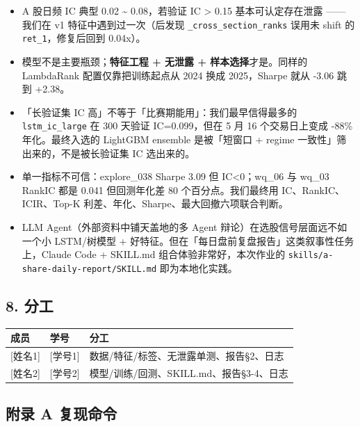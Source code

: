 \documentclass[
  fontset=fandol]{ctexart}
\providecommand{\tightlist}{%
  \setlength{\itemsep}{0pt}\setlength{\parskip}{0pt}}
\begin{document}
\begin{itemize}
\tightlist
\item
  A 股日频 IC 典型 0.02
  \textasciitilde{} 0.08，若验证 IC
  \textgreater{} 0.15 基本可认定存在泄露
  ------ 我们在 v1
  特征中遇到过一次（后发现
  \texttt{\_cross\_section\_ranks}
  误用未 shift 的
  \texttt{ret\_1}，修复后回到 0.04x）。
\item
  模型不是主要瓶颈；\textbf{特征工程 +
  无泄露 + 样本选择}才是。同样的
  LambdaRank 配置仅靠把训练起点从 2024
  换成 2025，Sharpe 就从 -3.06 跳到
  +2.38。
\item
  「长验证集 IC
  高」不等于「比赛期能用」：我们最早信得最多的
  \texttt{lstm\_ic\_large} 在 300 天验证
  IC=0.099，但在 5 月 16 个交易日上变成
  -88\% 年化。最终入选的 LightGBM
  ensemble 是被「短窗口 + regime
  一致性」筛出来的，不是被长验证集 IC
  选出来的。
\item
  单一指标不可信：explore\_038 Sharpe
  3.09 但 IC\textless0；wq\_06 与 wq\_03
  RankIC 都是 0.041 但回测年化差 80
  个百分点。我们最终用
  IC、RankIC、ICIR、Top-K
  利差、年化、Sharpe、最大回撤六项联合判断。
\item
  LLM Agent（外部资料中铺天盖地的多
  Agent 辩论）在选股信号层面远不如一个小
  LSTM/树模型 +
  好特征。但在「每日盘前复盘报告」这类叙事性任务上，Claude
  Code + SKILL.md
  组合体验非常好，本次作业的
  \texttt{skills/a-share-daily-report/SKILL.md}
  即为本地化实践。
\end{itemize}

\hypertarget{ux5206ux5de5}{%
\subsection{8.
分工}\label{ux5206ux5de5}}

\begin{longtable}[]{@{}lll@{}}
\toprule
成员 & 学号 & 分工 \\
\midrule
\endhead
{[}姓名1{]} & {[}学号1{]} &
数据/特征/标签、无泄露单测、报告§2、日志 \\
{[}姓名2{]} & {[}学号2{]} &
模型/训练/回测、SKILL.md、报告§3-4、日志 \\
\bottomrule
\end{longtable}

\hypertarget{ux9644ux5f55-a-ux590dux73b0ux547dux4ee4}{%
\subsection{附录 A
复现命令}\label{ux9644ux5f55-a-ux590dux73b0ux547dux4ee4}}
\end{document}
